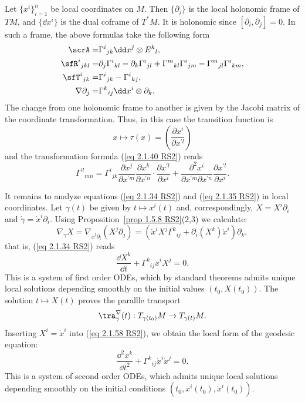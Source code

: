 \begin{rem}\label{rem 2.1.29 RS2}
    Let $\{x^i\}_{i=1}^n$ be local coordinates on $M$. Then $\{\partial_j\}$ is the local holonomic frame of $TM$, and $\{\dd x^i\}$ is the dual coframe of $T^\ast M$. It is holonomic since $[\partial_i,\partial_j]=0$. In such a frame, the above formulas take the following form 
    \begin{align}
        \scrA=&\Gamma^i{}_{jk}\dd x^j\otimes E^k{}_l,\\
        \sfR^i{}_{jkl}=&\partial_j\Gamma^i{}_{kl}-\partial_k\Gamma^i{}_{jl}+\Gamma^m{}_{kl}\Gamma^i{}_{jm}-\Gamma^m{}_{jl}\Gamma^i{}_{km},\\
        \sfT^i{}_{jk}=&\Gamma^i{}_{jk}-\Gamma^i{}_{kj},\\
        \nabla\partial_j=&\Gamma^k{}_{ij}\dd x^i\otimes\partial_k.
    \end{align}
    The change from one holonomic frame to another is given by the Jacobi matrix of the coordinate transformation. Thus, in this case the transition function is 
    \[x\mapsto \tau(x)=\left(\frac{\partial x^i}{\partial x^{\prime l}}\right)\]
    and the transformation formula (\ref{eq 2.1.40 RS2}) reads 
    \[\Gamma^{\prime l}{}_{mn}=
    \Gamma^i{}_{jk}\frac{\partial x^j}{\partial x^{\prime m}}  \frac{\partial x^k}{\partial x^{\prime n}}\cdot \frac{\partial x^{\prime l}}{\partial x^i}+
    \frac{\partial^2 x^i}{\partial x^{\prime m}\partial x^{\prime n}}\frac{\partial x^{\prime l}}{\partial x^i}.
    \]
\end{rem}


It remains to analyze equations (\ref{eq 2.1.34 RS2}) and (\ref{eq 2.1.35 RS2}) in local coordinates. Let $\gamma(t)$ be given by $t\mapsto x^i(t)$ and, correspondingly, $X=X^i\partial_i$ and $\dot\gamma=\dot x^i\partial_i$. Using Proposition~\ref{prop 1.5.8 RS2}(2,3) we calculate:
\[\nabla_{\dot\gamma}X=\nabla_{\dot x^i\partial_i}(X^j\partial_j)=(\dot x^iX^j\Gamma^k{}_{ij}+\partial_i(X^k)\dot x^i)\partial_k,\]
that is, (\ref{eq 2.1.34 RS2}) reads 
\[\frac{\dd X^k}{\dd t}+\Gamma^k{}_{ij}\dot x^i X^j=0.\label{eq 2.1.58 RS2}\]
This is a system of first order ODEs, which by standard theorems admits unique local solutions depending smoothly on the initial values $(t_0,X(t_0))$. The solution $t\mapsto X(t)$ proves the parallle transport 
\[\tra_{\gamma}^{\nabla}(t):T_{\gamma(t_0)}M\to T_{\gamma(t)}M.\]
Inserting $X^i=\dot x^i$ into (\ref{eq 2.1.58 RS2}), we obtain the local form of the geodesic equation:
\[\frac{\dd^2 x^k}{\dd t^2}+\Gamma^k{}_{ij}\dot x^i\dot x^j=0.\]
This is a system of second order ODEs, which admits unique local solutions depending smoothly on the initial conditions $(t_0,x^i(t_0),\dot x^i(t_0))$.

